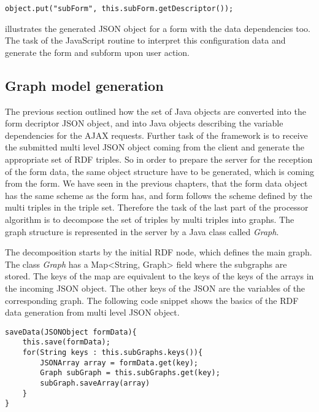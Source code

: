 \begin{lstlisting}[basicstyle=\footnotesize, frame=single, caption={Subform descriptor}, captionpos=b, belowskip=1em, aboveskip=2em]
	object.put("subForm", this.subForm.getDescriptor());
\end{lstlisting}


 illustrates the generated JSON object for a form with the data dependencies too. The task of the JavaScript routine to interpret this configuration data and generate the form and subform upon user action.



\subsection{Graph model generation}  \label{513}


The previous section outlined how the set of Java objects are converted into the form decriptor JSON object, and into Java objects describing the variable dependencies for the AJAX requests. Further task of the framework is to receive the submitted multi level JSON object coming from the client and generate the appropriate set of RDF triples. So in order to prepare the server for the reception of the form data, the same object structure have to be generated, which is coming from the form. We have seen in the previous chapters, that the form data object has the same scheme as the form has, and form follows the scheme defined by the multi triples in the triple set. Therefore the task of the last part of the processor algorithm is to decompose the set of triples by multi triples into graphs. The graph structure is represented in the server by a Java class called \textit{Graph}. 


The decomposition starts by the initial RDF node, which defines the main graph. The class \textit{Graph} has a Map<String, Graph> field where the subgraphs are stored. The keys of the map are equivalent to the keys of the keys of the arrays in the incoming JSON object. The other keys of the JSON are the variables of the corresponding graph. The following code snippet shows the basics of the RDF data generation from multi level JSON object. 

\begin{lstlisting}[basicstyle=\footnotesize, frame=single, caption={Subform descriptor}, label=dataGeneration captionpos=b, belowskip=1em, aboveskip=2em]
saveData(JSONObject formData){
	this.save(formData);
	for(String keys : this.subGraphs.keys()){
		JSONArray array = formData.get(key);
		Graph subGraph = this.subGraphs.get(key);
		subGraph.saveArray(array)					
	}
}
\end{lstlisting}

